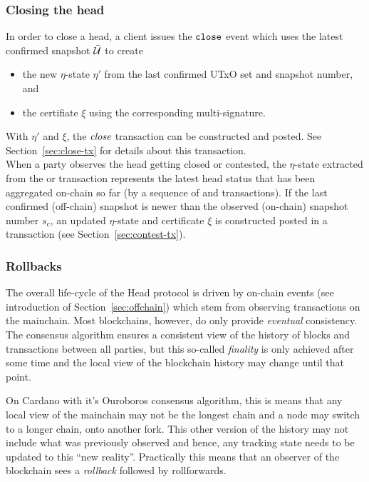 \subsubsection{Closing the head}

\quad In order to close a head, a client issues the
$\mathtt{close}$ event which uses the latest confirmed snapshot $\bar {\mathcal U}$ to create
\begin{itemize}
  \item the new $\eta$-state $\eta'$ from the last confirmed UTxO set and snapshot
        number, and
  \item the certifiate $\xi$ using the corresponding multi-signature.
\end{itemize}
With $\eta'$ and $\xi$, the $\textit{close}$ transaction can be constructed and
posted. See Section~\ref{sec:close-tx} for details about this transaction. \\

\quad When a party observes
the head getting closed or contested, the $\eta$-state extracted from the
\mtxClose{} or \mtxContest{} transaction represents the latest head status that
has been aggregated on-chain so far (by a sequence of \mtxClose{} and
\mtxContest{} transactions). If the last confirmed (off-chain) snapshot is newer
than the observed (on-chain) snapshot number $s_{c}$, an updated $\eta$-state
and certificate $\xi$ is constructed posted in a \mtxContest{} transaction (see
Section~\ref{sec:contest-tx}).

\subsubsection{Rollbacks}\label{sec:rollbacks}

The overall life-cycle of the Head protocol is driven by on-chain events (see
introduction of Section~\ref{sec:offchain}) which stem from observing
transactions on the mainchain. Most blockchains, however, do only provide
\emph{eventual} consistency. The consensus algorithm ensures a consistent view
of the history of blocks and transactions between all parties, but this
so-called \emph{finality} is only achieved after some time and the local view of
the blockchain history may change until that point.

On Cardano with it's Ouroboros consensus algorithm, this is means that any local
view of the mainchain may not be the longest chain and a node may switch to a
longer chain, onto another fork. This other version of the history may not
include what was previously observed and hence, any tracking state needs to be
updated to this ``new reality''. Practically this means that an observer of the
blockchain sees a \emph{rollback} followed by rollforwards.

